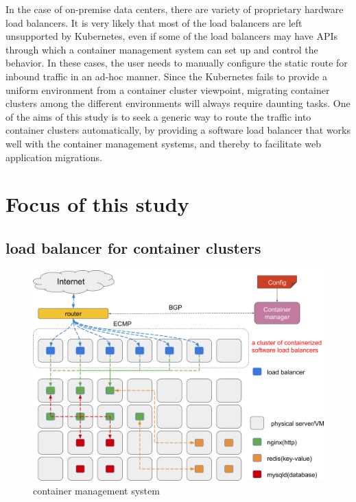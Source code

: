 In the case of on-premise data centers, there are variety of proprietary hardware load balancers.
It is very likely that most of the load balancers are left unsupported by Kubernetes, even if some of the load balancers may have APIs through which a container management system can set up and control the behavior.
In these cases, the user needs to manually configure the static route for inbound traffic in an ad-hoc manner.
Since the Kubernetes fails to provide a uniform environment from a container cluster viewpoint, migrating container clusters among the different environments will always require daunting tasks.
One of the aims of this study is to seek a generic way to route the traffic into container clusters automatically, by providing a software load balancer that works well with the container management systems, and thereby to facilitate web application migrations.


\section{Focus of this study}

\subsection{load balancer for container clusters}

\begin{figure}[h]
\begin{center}
\includegraphics[width=0.9\columnwidth]{Figs/cluster_of_container_loadbalancer}
\end{center}
\caption{
container management system
}

\label{fig:cluster_of_container_loadbalancer}
\end{figure}

